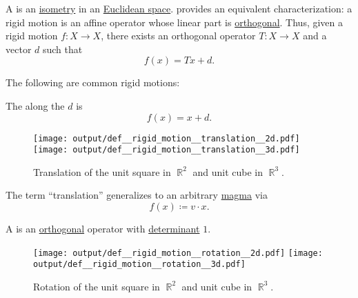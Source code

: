 \begin{definition}\label{def:rigid_motion}\mimprovised
  A  is an \hyperref[def:isometry]{isometry} in an \hyperref[def:euclidean_space]{Euclidean space}.  provides an equivalent characterization: a rigid motion is an affine operator whose linear part is \hyperref[def:unitary_operator]{orthogonal}. Thus, given a rigid motion \( f: X \to X \), there exists an orthogonal operator \( T: X \to X \) and a vector \( d \) such that
  \begin{equation*}
    f(x) = Tx + d.
  \end{equation*}

  The following are common rigid motions:
  \begin{thmenum}
     The  along the  \( d \) is
    \begin{equation*}
      f(x) = x + d.
    \end{equation*}

    \begin{figure}[!ht]
      \hfill
      \texttt{[image: output/def\_\_rigid\_motion\_\_translation\_\_2d.pdf]}
      \hfill
      \texttt{[image: output/def\_\_rigid\_motion\_\_translation\_\_3d.pdf]}
      \hfill
      \hfill
      \caption{Translation of the unit square in \( \BbbR^2 \) and unit cube in \( \BbbR^3 \).}\label{fig:def/rigid_motion/translation}
    \end{figure}

    The term \enquote{translation} generalizes to an arbitrary \hyperref[def:magma]{magma} via
    \begin{equation*}
      f(x) \coloneqq v \cdot x.
    \end{equation*}

     A  is an \hyperref[def:orthogonal_operator]{orthogonal} operator with \hyperref[def:matrix_determinant]{determinant} \( 1 \).

    \begin{figure}[!ht]
      \hfill
      \texttt{[image: output/def\_\_rigid\_motion\_\_rotation\_\_2d.pdf]}
      \hfill
      \texttt{[image: output/def\_\_rigid\_motion\_\_rotation\_\_3d.pdf]}
      \hfill
      \hfill
      \caption{Rotation of the unit square in \( \BbbR^2 \) and unit cube in \( \BbbR^3 \).}\label{fig:def/rigid_motion/rotation}
    \end{figure}


\end{thmenum}
\end{definition}
